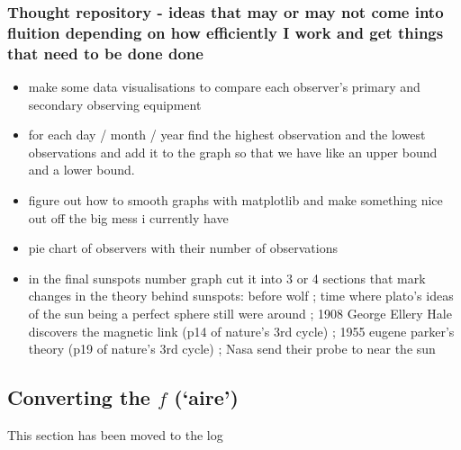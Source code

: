 \documentclass[12pt]{article}
\begin{document}
\subsubsection{Thought repository - ideas that may or may not come into fluition depending on how efficiently I work and get things that need to be done done}
\begin{itemize}
    \item make some data visualisations to compare each observer's primary and secondary observing equipment
    \item for each day / month / year find the highest observation and the lowest observations and add it to the graph so that we have like an upper bound and a lower bound. 
    \item figure out how to smooth graphs with matplotlib and make something nice out off the big mess i currently have
    \item pie chart of observers with their number of observations
    \item in the final sunspots number graph cut it into 3 or 4 sections that mark changes in the theory behind sunspots: before wolf ; time where plato's ideas of the sun being a perfect sphere still were around ; 1908 George Ellery Hale discovers the magnetic link (p14 of nature's 3rd cycle) ; 1955 eugene parker's theory (p19 of nature's 3rd cycle) ; Nasa send their probe to near the sun
\end{itemize}

\subsection{Converting the $f$ (`aire')}\label{converting the `aire'}
This section has been moved to the log
\end{document}
